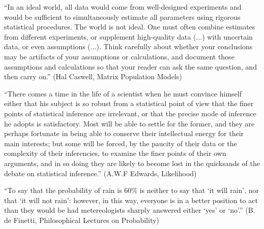 \documentclass[12pt,a4paper]{article}
\begin{document}
``In an ideal world, all data would come from well-designed experiments
and would be sufficient to simultaneously estimate all parameters using rigorous
statistical procedures. The world is not ideal. One must often combine estimates
from different experiments, or supplement high-quality data (...) with uncertain
data, or even assumptions (...). Think carefully about whether your conclusions
may be artifacts of your assumptions or calculations, and document those assumptions
and calculations so that your reader can ask the same question, and then carry on.''
(Hal Caswell, Matrix Population Models)

``There comes a time in the life of a scientist when he must convince himself
either that his subject is so robust from a statistical point of view that
the finer points of statistical inference are irrelevant, or that the precise
mode of inference he adopts is satisfactory. Most will be able to settle for
the former, and they are perhaps fortunate in being able to conserve their
intellectual energy for their main interests; but some will be forced, by the
paucity of their data or the complexity of their inferencies, to examine
the finer points of their own arguments, and in so doing they are likely
to become lost in the quicksands of the debate on statistical inference.''
(A.W.F Edwards, Likelihood)


``To say that the probability of rain is 60\% is neither to say that
`it will rain', nor that `it will not rain': however, in this way,
everyone is in a better position to act than they would be had
metereologists sharply answered either `yes' or `no'.''
(B. de Finetti, Philosophical Lectures on Probability)
\end{document}
